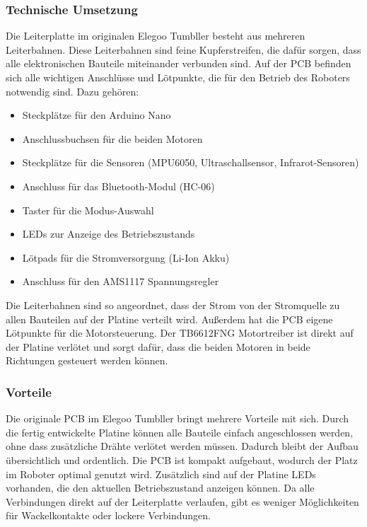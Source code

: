 \subsubsection{Technische Umsetzung}
Die Leiterplatte im originalen Elegoo Tumbller besteht aus mehreren Leiterbahnen.
Diese Leiterbahnen sind feine Kupferstreifen,
die dafür sorgen,
dass alle elektronischen Bauteile miteinander verbunden sind.
%
Auf der PCB befinden sich alle wichtigen Anschlüsse und Lötpunkte,
die für den Betrieb des Roboters notwendig sind. Dazu gehören:
\begin{itemize}
    \item Steckplätze für den Arduino Nano
    \item Anschlussbuchsen für die beiden Motoren
    \item Steckplätze für die Sensoren (MPU6050, Ultraschallsensor, Infrarot-Sensoren)
    \item Anschluss für das Bluetooth-Modul (HC-06)
    \item Taster für die Modus-Auswahl
    \item LEDs zur Anzeige des Betriebszustands
    \item Lötpads für die Stromversorgung (Li-Ion Akku)
    \item Anschluss für den AMS1117 Spannungsregler
\end{itemize}
Die Leiterbahnen sind so angeordnet,
dass der Strom von der Stromquelle zu allen Bauteilen auf der Platine verteilt wird.
%
Außerdem hat die PCB eigene Lötpunkte für die Motorsteuerung.
%
Der TB6612FNG Motortreiber ist direkt auf der Platine verlötet und sorgt dafür,
dass die beiden Motoren in beide Richtungen gesteuert werden können.
%
\subsubsection{Vorteile}
Die originale PCB im Elegoo Tumbller bringt mehrere Vorteile mit sich.
%
Durch die fertig entwickelte Platine können alle Bauteile einfach angeschlossen werden,
ohne dass zusätzliche Drähte verlötet werden müssen.
%
Dadurch bleibt der Aufbau übersichtlich und ordentlich.
%
Die PCB ist kompakt aufgebaut,
wodurch der Platz im Roboter optimal genutzt wird.
%
Zusätzlich sind auf der Platine LEDs vorhanden,
die den aktuellen Betriebszustand anzeigen können.
%
Da alle Verbindungen direkt auf der Leiterplatte verlaufen,
gibt es weniger Möglichkeiten für Wackelkontakte oder lockere Verbindungen.

